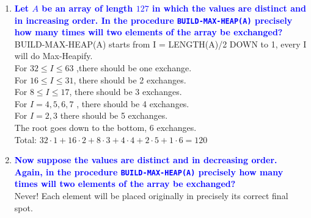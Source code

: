 \documentclass[11pt]{article}
\begin{document}
\begin{enumerate}
\item \textbf{\textcolor{blue}{Let $A$ be an array of length $127$ in which the values are
distinct and in increasing order.  In the procedure 
{\tt BUILD-MAX-HEAP(A)} precisely how many times will two elements
of the array be exchanged?}}
    \\ BUILD-MAX-HEAP(A) starts from I = LENGTH(A)/2 DOWN to 1, every I will 
    do Max-Heapify. \\ For $32\leq I\leq 63$ ,there should be one exchange.
    \\ For $16\leq I \leq 31$, there should be 2 exchanges. 
    \\ For $8\leq  I \leq 17$, there should be 3 exchanges. 
    \\ For $I=4,5,6,7$ , there should be 4 exchanges. 
    \\ For $I = 2,3$ there should be 5 exchanges. 
    \\ The root goes down to the bottom, 6 exchanges. 
    \\ Total: $32\cdot 1+16\cdot 2+8\cdot 3+4\cdot 4+2\cdot 5+1\cdot 6 = 120$
\item \textbf{\textcolor{blue}{Now suppose the values are distinct and in decreasing order. Again, in the procedure 
{\tt BUILD-MAX-HEAP(A)} precisely how many times will two elements
of the array be exchanged?}}
    \\ Never!  Each element will be placed originally in precisely its
    correct final spot.
\end{enumerate}
    
\end{document}
